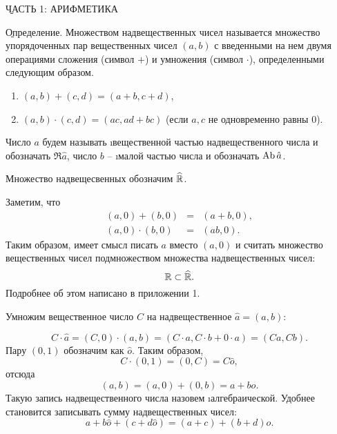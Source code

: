 \begin{center}
	\b{ЧАСТЬ 1: АРИФМЕТИКА}
\end{center}

\b{Определение.} Множеством надвещественных чисел называется множество упорядоченных пар вещественных чисел $(a, b)$ с введенными на нем двумя операциями сложения (символ $+$) и умножения (символ $\cdot$), определенными следующим образом.
	\begin{enumerate}
		\item $(a, b)+(c, d)=(a+b, c+d)$, \eqnum\label{eq:sumdef}
		\item $(a, b)\cdot(c, d)=(ac, ad+bc)$ (если $a, c$ не одновременно равны $0$). \eqnum\label{eq:multdef}
	\end{enumerate}
Число $a$ будем называть \i{вещественной} частью надвещественного числа и обозначать $\Re{\hat a}$, число $b$ -- \i{малой} частью числа и обозначать $\operatorname{Ab}{\hat a}$.\par
Множество надвещесвенных обозначим $\widehat{\mathbb{R}}$. \par
Заметим, что
	\begin{eqnarray*}
		(a, 0)+(b, 0) &=&(a+b, 0), \\
		(a, 0)\cdot(b, 0)&=&(ab, 0).
	\end{eqnarray*}
Таким образом, имеет смысл писать $a$ вместо $(a, 0)$ и считать множество вещественных чисел подмножеством множества надвещественных чисел:
	$$\mathbb{R}\subset \widehat{\mathbb{R}}.$$
Подробнее об этом написано в приложении 1.
\begin{example} 
	Умножим вещественное число $C$ на надвещественное $\hat{a}=(a, b)$:
\end{example}
	$$C\cdot\hat{a}=(C, 0)\cdot(a, b)=(C\cdot a, C\cdot b+0\cdot a)=(Ca, Cb).$$
Пару $(0, 1)$ обозначим как $\hat{o}$. Таким образом,
	$$C\cdot(0, 1)=(0, C)=C\hat{o},$$
отсюда 
	\begin{equation}
		(a, b)=(a, 0)+(0, b)=a+b\hat{o}.
	\end{equation}
Такую запись надвещественного числа назовем \i{алгебраической}. Удобнее становится записывать сумму надвещественных чисел:
	\begin{equation}
		a+b\hat{o}+(c+d\hat{o})=(a+c)+(b+d)\hat{o}.
	\end{equation}

